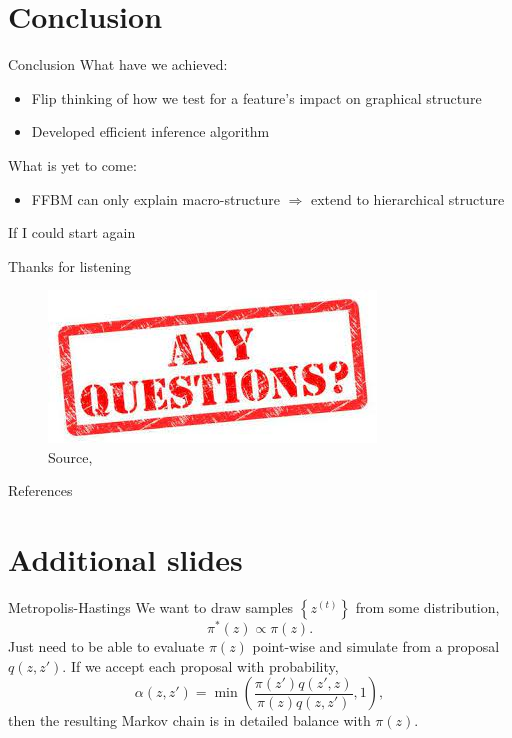 \documentclass{beamer}
\begin{document}
\section{Conclusion}

	\begin{frame}{Conclusion}
		What have we achieved:
		\begin{itemize}
			\item Flip thinking of how we test for a feature's impact on graphical structure
			\item Developed efficient inference algorithm
		\end{itemize}
		What is yet to come:
		\begin{itemize}
			\item FFBM can only explain macro-structure $\Rightarrow$ extend to hierarchical structure
		\end{itemize}
		If I could start again
	\end{frame}

	
	\begin{frame}{Thanks for listening}
		\begin{figure}
			\includegraphics[width=0.6\linewidth]{any-questions.jpg}
			\caption{Source, \citet{any-Qs}}
		\end{figure}

	\end{frame}

	\begin{frame}{References}
		\tiny
		
	\end{frame}

\section*{Additional slides}

	\begin{frame}{Metropolis-Hastings \cite{hastings-alg}}
		We want to draw samples $\left\{ z^{(t)} \right\}$ from some distribution,
		$$\pi^*(z) \propto \pi(z).$$
		Just need to be able to evaluate $\pi(z)$ point-wise and simulate from a proposal $q(z, z')$. If we accept each proposal with probability,
		$$\alpha(z, z') = \min \left( \frac{\pi(z') q(z', z)}{\pi(z) q(z, z')} , 1 \right),$$
		then the resulting Markov chain is in detailed balance with $\pi(z)$.
	\end{frame}
	
\end{document}

